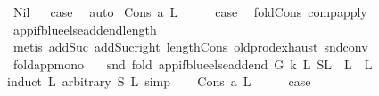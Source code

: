 \begin{isabellebody}
\isamarkupfalse%
\ Nil\isanewline
{}\isamarkupfalse%
\ \isamarkupfalse%
\ {\isacharquery}{\kern0pt}case\ \isamarkupfalse%
\ auto\isanewline
{}\isamarkupfalse%
\isanewline
{}\isamarkupfalse%
\ {\isacharparenleft}{\kern0pt}Cons\ a\ L{}{\isacharparenright}{\kern0pt}\isanewline
\ \ \isamarkupfalse%
\ \isamarkupfalse%
\ {\isacharquery}{\kern0pt}case\ \isamarkupfalse%
\ fold{\isacharunderscore}{\kern0pt}Cons\ comp{\isacharunderscore}{\kern0pt}apply\ \isamarkupfalse%
\ app{\isacharunderscore}{\kern0pt}if{\isacharunderscore}{\kern0pt}blue{\isacharunderscore}{\kern0pt}else{\isacharunderscore}{\kern0pt}add{\isacharunderscore}{\kern0pt}end{\isacharunderscore}{\kern0pt}length\isanewline
\ \ \ \ \isamarkupfalse%
\ {\isacharparenleft}{\kern0pt}metis\ add{\isacharunderscore}{\kern0pt}Suc\ add{\isacharunderscore}{\kern0pt}Suc{\isacharunderscore}{\kern0pt}right\ length{\isacharunderscore}{\kern0pt}Cons\ old{\isachardot}{\kern0pt}prod{\isachardot}{\kern0pt}exhaust\ snd{\isacharunderscore}{\kern0pt}conv{\isacharparenright}{\kern0pt}\ \isanewline
{}\isamarkupfalse%
%
\endisatagproof
{\isafoldproof}%
%
\isadelimproof
\isanewline
%
\endisadelimproof
\ \ \isanewline
{}\isamarkupfalse%
\ fold{\isacharunderscore}{\kern0pt}app{\isacharunderscore}{\kern0pt}mono{\isacharcolon}{\kern0pt}\isanewline
\ \ \ {\isachardoublequoteopen}snd\ {\isacharparenleft}{\kern0pt}fold\ {\isacharparenleft}{\kern0pt}app{\isacharunderscore}{\kern0pt}if{\isacharunderscore}{\kern0pt}blue{\isacharunderscore}{\kern0pt}else{\isacharunderscore}{\kern0pt}add{\isacharunderscore}{\kern0pt}end\ G\ k{\isacharparenright}{\kern0pt}\ L{}\ {\isacharparenleft}{\kern0pt}S{\isacharcomma}{\kern0pt}L{}{\isacharparenright}{\kern0pt}{\isacharparenright}{\kern0pt}\ {\isacharequal}{\kern0pt}\ L{}\ {\isacharat}{\kern0pt}\ L{}\ {\isachardoublequoteclose}\isanewline
%
\isadelimproof
%
\endisadelimproof
%
\isatagproof
{}\isamarkupfalse%
{\isacharparenleft}{\kern0pt}induct\ L{}\ arbitrary{\isacharcolon}{\kern0pt}\ S\ L{}{\isacharcomma}{\kern0pt}\ simp{\isacharparenright}{\kern0pt}\isanewline
\ \ \isamarkupfalse%
\ {\isacharparenleft}{\kern0pt}Cons\ a\ L{}{\isacharparenright}{\kern0pt}\isanewline
\ \ \isamarkupfalse%
\ \isamarkupfalse%
\ {\isacharquery}{\kern0pt}case\ \isamarkupfalse%

\end{isabellebody}

